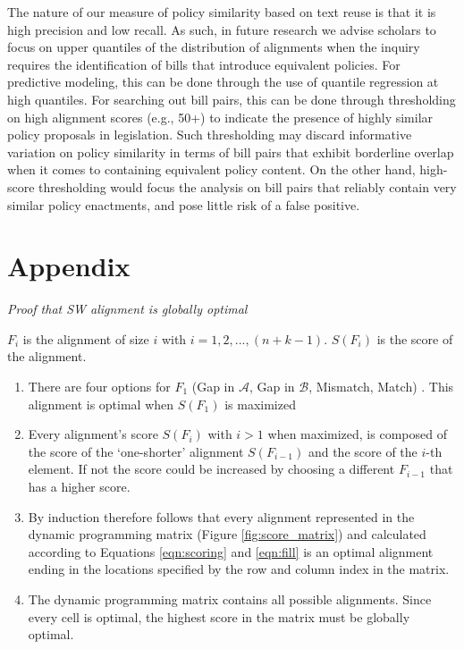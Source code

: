 \documentclass[12pt]{article} %
\begin{document}
The nature of our measure of policy similarity based on text reuse is that it is high precision and low recall.  As such, in future research we advise scholars to focus on upper quantiles of the distribution of alignments when the inquiry requires the identification of bills that introduce equivalent policies. For predictive modeling, this can be done through the use of quantile regression at high quantiles. For searching out bill pairs, this can be done through thresholding on high alignment scores (e.g., 50+) to indicate the presence of highly similar policy proposals in legislation. Such thresholding may discard informative variation on policy similarity in terms of bill pairs that exhibit borderline overlap when it comes to containing equivalent policy content. On the other hand, high-score thresholding would focus the analysis on bill pairs that reliably contain very similar policy enactments, and pose little risk of a false positive.






\clearpage

\section*{Appendix}

\textit{Proof that SW alignment is globally optimal}

$F_i$ is the alignment of size $i$ with $i = 1,2,...,(n + k - 1)$. $S(F_i)$ is the score of the alignment.

\begin{enumerate}
\item There are four options for $F_1$ (Gap in $\mathcal{A}$, Gap in
    $\mathcal{B}$, Mismatch, Match) . This alignment is optimal when $S(F_1)$ is maximized
\item Every alignment's score $S(F_i)$ with $i > 1$ when maximized, is composed of the score of the `one-shorter' alignment $S(F_{i-1})$ and the score of the $i$-th element. If not the score could be increased by choosing a different $F_{i-1}$ that has a higher score.
\item By induction therefore follows that every alignment represented in the
    dynamic programming matrix (Figure \ref{fig:score_matrix}) and calculated according
        to Equations \ref{eqn:scoring} and \ref{eqn:fill} is an optimal alignment
    ending in the locations specified by the row and column index in the matrix.
\item The dynamic programming matrix contains all possible alignments. Since
    every cell is optimal, the highest score in the matrix must be globally
    optimal.
\end{enumerate}
\end{document}
